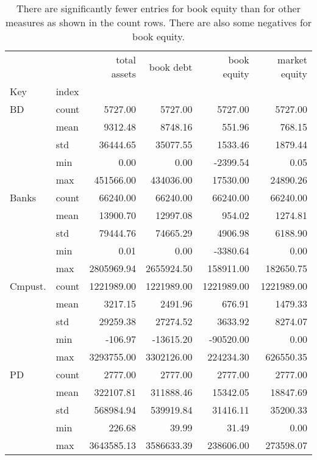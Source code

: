 \begin{table}
\caption{
    There are significantly fewer entries for book equity
    than for other measures as shown in the count rows.
    There are also some negatives for book equity.
    }
\label{tab:Table 2.1}
\begin{tabular}{llrrrr}
\toprule
 &  & total assets & book debt & book equity & market equity \\
Key & index &  &  &  &  \\
\midrule
{BD} & count & 5727.00 & 5727.00 & 5727.00 & 5727.00 \\
 & mean & 9312.48 & 8748.16 & 551.96 & 768.15 \\
 & std & 36444.65 & 35077.55 & 1533.46 & 1879.44 \\
 & min & 0.00 & 0.00 & -2399.54 & 0.05 \\
 & max & 451566.00 & 434036.00 & 17530.00 & 24890.26 \\
\cline{1-6}
{Banks} & count & 66240.00 & 66240.00 & 66240.00 & 66240.00 \\
 & mean & 13900.70 & 12997.08 & 954.02 & 1274.81 \\
 & std & 79444.76 & 74665.29 & 4906.98 & 6188.90 \\
 & min & 0.01 & 0.00 & -3380.64 & 0.00 \\
 & max & 2805969.94 & 2655924.50 & 158911.00 & 182650.75 \\
\cline{1-6}
{Cmpust.} & count & 1221989.00 & 1221989.00 & 1221989.00 & 1221989.00 \\
 & mean & 3217.15 & 2491.96 & 676.91 & 1479.33 \\
 & std & 29259.38 & 27274.52 & 3633.92 & 8274.07 \\
 & min & -106.97 & -13615.20 & -90520.00 & 0.00 \\
 & max & 3293755.00 & 3302126.00 & 224234.30 & 626550.35 \\
\cline{1-6}
{PD} & count & 2777.00 & 2777.00 & 2777.00 & 2777.00 \\
 & mean & 322107.81 & 311888.46 & 15342.05 & 18847.69 \\
 & std & 568984.94 & 539919.84 & 31416.11 & 35200.33 \\
 & min & 226.68 & 39.99 & 31.49 & 0.00 \\
 & max & 3643585.13 & 3586633.39 & 238606.00 & 273598.07 \\
\cline{1-6}
\bottomrule
\end{tabular}
\end{table}
